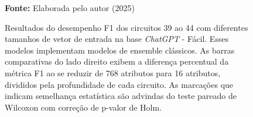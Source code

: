 \begin{figure}
\caption{Resultados do desempenho F1 dos circuitos 39 ao 44 com diferentes tamanhos de vetor de entrada na base \textit{ChatGPT} - Fácil. Esses modelos implementam modelos de ensemble clássicos. As barras comparativas do lado direito exibem a diferença percentual da métrica F1 ao se reduzir de 768 atributos para 16 atributos, divididos pela profundidade de cada circuito. As marcações que indicam semelhança estatística são advindas do teste pareado de Wilcoxon com correção de p-valor de Holm.}
\label{fig:n_features:easy:g8}
     \centering
    \centering
      \par\medskip\ABNTEXfontereduzida\selectfont\textbf{Fonte:} Elaborada pelo autor (2025) \par\medskip
\end{figure}